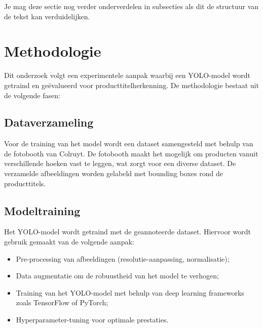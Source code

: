 
Je mag deze sectie nog verder onderverdelen in subsecties als dit de structuur van de tekst kan verduidelijken.

\section{Methodologie}%
\label{sec:methodologie}

Dit onderzoek volgt een experimentele aanpak waarbij een YOLO-model wordt getraind en geëvalueerd voor producttitelherkenning. De methodologie bestaat uit de volgende fasen:

\subsection{Dataverzameling}
Voor de training van het model wordt een dataset samengesteld met behulp van de fotobooth van Colruyt. De fotobooth maakt het mogelijk om producten vanuit verschillende hoeken vast te leggen, wat zorgt voor een diverse dataset. De verzamelde afbeeldingen worden gelabeld met bounding boxes rond de producttitels.

\subsection{Modeltraining}
Het YOLO-model wordt getraind met de geannoteerde dataset. Hiervoor wordt gebruik gemaakt van de volgende aanpak:
\begin{itemize}
    \item Pre-processing van afbeeldingen (resolutie-aanpassing, normalisatie);
    \item Data augmentatie om de robuustheid van het model te verhogen;
    \item Training van het YOLO-model met behulp van deep learning frameworks zoals TensorFlow of PyTorch;
    \item Hyperparameter-tuning voor optimale prestaties.
\end{itemize}

